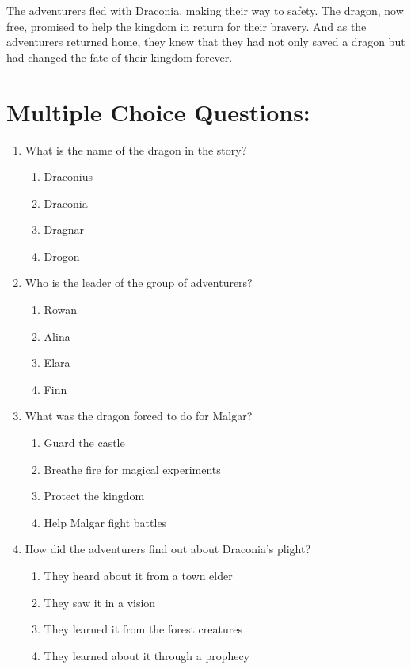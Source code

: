 \documentclass[12pt]{article}
\begin{document}
The adventurers fled with Draconia, making their way to safety. The dragon, now free, promised to help the kingdom in return for their bravery. And as the adventurers returned home, they knew that they had not only saved a dragon but had changed the fate of their kingdom forever.

\newpage

\section*{Multiple Choice Questions:}

\begin{enumerate}

\item What is the name of the dragon in the story?
\begin{enumerate}[label=\Alph*.]
    \item Draconius
    \item Draconia
    \item Dragnar
    \item Drogon
\end{enumerate}

\vspace{0.5cm}

\item Who is the leader of the group of adventurers?
\begin{enumerate}[label=\Alph*.]
    \item Rowan
    \item Alina
    \item Elara
    \item Finn
\end{enumerate}

\vspace{0.5cm}

\item What was the dragon forced to do for Malgar?
\begin{enumerate}[label=\Alph*.]
    \item Guard the castle
    \item Breathe fire for magical experiments
    \item Protect the kingdom
    \item Help Malgar fight battles
\end{enumerate}

\vspace{0.5cm}

\item How did the adventurers find out about Draconia's plight?
\begin{enumerate}[label=\Alph*.]
    \item They heard about it from a town elder
    \item They saw it in a vision
    \item They learned it from the forest creatures
    \item They learned about it through a prophecy
\end{enumerate}


\end{enumerate}
\end{document}
